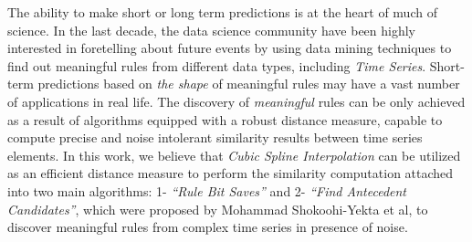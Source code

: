 The ability to make short or long term predictions is at the heart of much of science.
In the last decade, the data science community have been highly interested in foretelling about future events by using data mining techniques to find out meaningful rules from different data types, including \textit{Time Series}. Short-term predictions based on \textit{the shape} of meaningful rules may have a vast number of applications in real life. The discovery of \textit{meaningful} rules can be only achieved as a result of algorithms equipped with a robust distance measure, capable to compute precise and noise intolerant similarity results between time series elements. In this work, we believe that \textit{Cubic Spline Interpolation} can be utilized as an efficient distance measure to perform the similarity computation attached into two main algorithms: 1- \textit{\enquote{Rule Bit Saves}} and 2- \textit{\enquote{Find Antecedent Candidates}}, which were proposed by Mohammad Shokoohi-Yekta et al, to discover meaningful rules from complex time series in presence of noise.